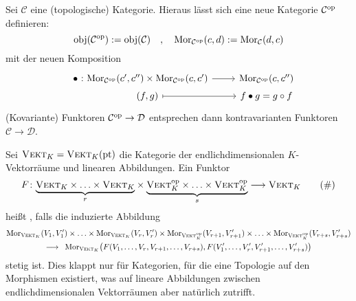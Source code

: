 \noindent Sei $\mathcal{C}$ eine (topologische) Kategorie. Hieraus lässt sich eine neue Kategorie $\mathcal{C}^{\mathrm{op}}$ definieren:
\[
	\operatorname{obj}(\mathcal{C}^{\mathrm{op}}) := \operatorname{obj}(\mathcal{C}) \quad , \quad \operatorname{Mor}_{\mathcal{C}^{\mathrm{op}}}(c,d) := \operatorname{Mor}_{\mathcal{C}}(d,c)
\]
mit der neuen Komposition
\[
	\begin{tikzcd}[row sep=0.1em]
		\bullet \mbox{ :}\hspace{-4em} & \Mor_{\mathcal{C}^\op}(c',c'') \times \Mor_{\mathcal{C}^\op}(c,c') \rar & \Mor_{\mathcal{C}^\op}(c,c'') \\
		& (f,g) \rar[mapsto] & f \bullet g = g \circ f
	\end{tikzcd}
\]
(Kovariante) Funktoren $\mathcal{C}^{\mathrm{op}} \to \mathcal{D}$ entsprechen dann kontravarianten Funktoren $\mathcal{C}\to \mathcal{D}$. 

Sei $\textsc{Vekt}_K = \textsc{Vekt}_K(\mathrm{pt})$ die Kategorie der endlichdimensionalen $K$-Vektorräume und linearen Abbildungen. Ein Funktor
\begin{equation}
	F \colon {\underbrace{\textsc{Vekt}_K \times \ldots \times \textsc{Vekt}_K}_{r}} \times {\underbrace{\textsc{Vekt}_K^{\mathrm{op}}\times \ldots \times \textsc{Vekt}_K^{\mathrm{op}}}_{s}} \longrightarrow \textsc{Vekt}_K \label{eq:24}\tag{\#}
\end{equation}
heißt , falls die induzierte Abbildung
\begin{gather*}
	\Mor_{\VEKT_K}(V_1,V'_1) \times \ldots \times \Mor_{\VEKT_K}(V_r,V'_r) \times \Mor_{\VEKT_K^\op}(V_{r+1},V'_{r+1}) \times \ldots \times \Mor_{\VEKT_K^\op}(V_{r+s},V'_{r+s}) \\
	\longrightarrow \enspace\Mor_{\VEKT_K} \enbrace*{F(V_1, \ldots,V_r,V_{r+1}, \ldots , V_{r+s}), F (V'_1, \ldots , V'_r, V'_{r+1}, \ldots , V'_{r+s})} 
\end{gather*}
stetig ist. Dies klappt nur für Kategorien, für die eine Topologie auf den Morphismen existiert, was auf lineare Abbildungen zwischen endlichdimensionalen Vektorräumen aber 
natürlich zutrifft.


